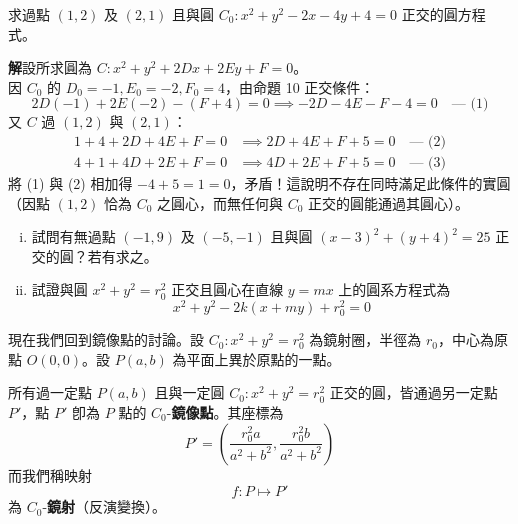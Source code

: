 \begin{example}
求過點 $(1,2)$ 及 $(2,1)$ 且與圓 $C_0 : x^2 + y^2 - 2x - 4y + 4 = 0$ 正交的圓方程式。

\textbf{解}\quad 設所求圓為 $C : x^2 + y^2 + 2Dx + 2Ey + F = 0$。\\
因 $C_0$ 的 $D_0 = -1, E_0 = -2, F_0 = 4$，由命題 10 正交條件：
\[ 2D(-1) + 2E(-2) - (F + 4) = 0 \implies -2D - 4E - F - 4 = 0 \quad \text{--- (1)} \]
又 $C$ 過 $(1,2)$ 與 $(2,1)$：
\begin{align*}
1 + 4 + 2D + 4E + F = 0 &\implies 2D + 4E + F + 5 = 0 \quad \text{--- (2)} \\
4 + 1 + 4D + 2E + F = 0 &\implies 4D + 2E + F + 5 = 0 \quad \text{--- (3)}
\end{align*}
將 (1) 與 (2) 相加得 $-4 + 5 = 1 = 0$，矛盾！這說明不存在同時滿足此條件的實圓（因點 $(1,2)$ 恰為 $C_0$ 之圓心，而無任何與 $C_0$ 正交的圓能通過其圓心）。
\end{example}

\begin{exercise}
\begin{enumerate}[(i)]
  \item 試問有無過點 $(-1,9)$ 及 $(-5,-1)$ 且與圓 $(x-3)^2 + (y+4)^2 = 25$ 正交的圓？若有求之。
  \item 試證與圓 $x^2 + y^2 = r_0^2$ 正交且圓心在直線 $y = mx$ 上的圓系方程式為
  \[ x^2 + y^2 - 2k(x + my) + r_0^2 = 0 \]
\end{enumerate}
\end{exercise}

現在我們回到鏡像點的討論。設 $C_0 : x^2 + y^2 = r_0^2$ 為鏡射圈，半徑為 $r_0$，中心為原點 $O(0,0)$。設 $P(a,b)$ 為平面上異於原點的一點。

\begin{theorem}
所有過一定點 $P(a,b)$ 且與一定圓 $C_0 : x^2 + y^2 = r_0^2$ 正交的圓，皆通過另一定點 $P'$，點 $P'$ 卽為 $P$ 點的 $C_0$-\textbf{鏡像點}。其座標為
\begin{equation}
P' = \left(\frac{r_0^2 a}{a^2 + b^2}, \frac{r_0^2 b}{a^2 + b^2}\right) \label{eq:b4s-3-6-inversion}
\end{equation}
而我們稱映射
\[ f : P \mapsto P' \]
為 $C_0$-\textbf{鏡射}（反演變換）。
\end{theorem}

